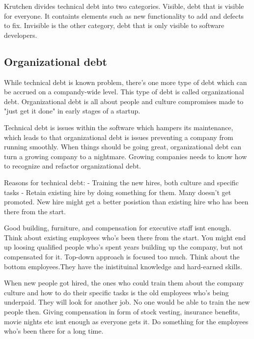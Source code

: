 Krutchen divides technical debt into two categories. Visible, debt that is visible for everyone. It containts elements such as new functionality to add and defects to fix. Invisible is the other category, debt that is only visible to software developers.

\subsection{Organizational debt}
While technical debt is known problem, there's one more type of debt which can be accrued on a compandy-wide level. This type of debt is called organizational debt. Organizational debt is all about people and culture compromises made to "just get it done" in early stages of a startup\cite{steve-blank}.  

Technical debt is issues within the software which hampers its maintenance, which leads to that organizational debt is issues preventing a company from running smoothly. When things should be going great, organizational debt can turn a growing company to a nightmare. Growing companies needs to know how to recognize and refactor organizational debt. 

Reasons for technical debt:
- Training the new hires, both culture and specific tasks
- Retain existing hire by doing something for them. Many doesn't get promoted. New hire might get a better posistion than existing hire who has been there from the start.

Good building, furniture, and compensation for executive staff isnt enough. Think about existing employees who's been there from the start. You might end up loosing qualified people who's spent years building up the company, but not compensated for it. Top-down approach is focused too much. Think about the bottom employees.They have the inistituinal knowledge and hard-earned skills.

When new people got hired, the ones who could train them about the company culture and how to do their specific tasks is the old employees who's being underpaid. They will look for another job. No one would be able to train the new people then. Giving compensation in form of stock vesting, insurance benefits, movie nights etc isnt enough as everyone gets it. Do something for the employees who's been there for a long time.

